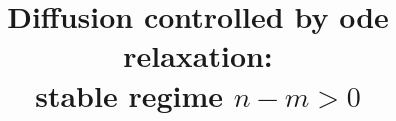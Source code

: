 \documentclass[a4paper,11pt]{article}
\theoremstyle{remark}
\begin{document}
\title{Diffusion controlled by ode relaxation:\\stable regime $n-m>0$}
\date{}

\maketitle

\renewcommand{\thefootnote}{\arabic{footnote}}

\maketitle

\begin{abstract}
\end{abstract}

\tableofcontents
\pagebreak 
 
\end{document}
